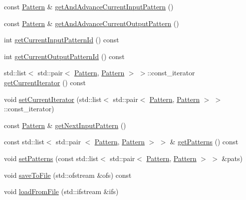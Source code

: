 \begin{DoxyCompactItemize}
const \hyperlink{classcryomesh_1_1state_1_1Pattern}{\-Pattern} \& \hyperlink{classcryomesh_1_1state_1_1Sequence_ab9ace25c4ec3b2490dfbffff27fc51e8}{get\-And\-Advance\-Current\-Input\-Pattern} ()
\item 
const \hyperlink{classcryomesh_1_1state_1_1Pattern}{\-Pattern} \& \hyperlink{classcryomesh_1_1state_1_1Sequence_a516640e73b0f09ee08758d9ce89e51f4}{get\-And\-Advance\-Current\-Output\-Pattern} ()
\item 
int \hyperlink{classcryomesh_1_1state_1_1Sequence_a7f12365034bd9d6453a29384e232f9a5}{get\-Current\-Input\-Pattern\-Id} () const 
\item 
int \hyperlink{classcryomesh_1_1state_1_1Sequence_a97659380bb1c69d31a012c3b9c9053e8}{get\-Current\-Output\-Pattern\-Id} () const 
\item 
std\-::list$<$ std\-::pair$<$ \hyperlink{classcryomesh_1_1state_1_1Pattern}{\-Pattern}, \*
\hyperlink{classcryomesh_1_1state_1_1Pattern}{\-Pattern} $>$ $>$\-::const\-\_\-iterator \hyperlink{classcryomesh_1_1state_1_1Sequence_a65b44032582f5585d5d2f77f3e5a58e4}{get\-Current\-Iterator} () const 
\item 
void \hyperlink{classcryomesh_1_1state_1_1Sequence_afa89b46faf1c362b228e8f1efe573305}{set\-Current\-Iterator} (std\-::list$<$ std\-::pair$<$ \hyperlink{classcryomesh_1_1state_1_1Pattern}{\-Pattern}, \hyperlink{classcryomesh_1_1state_1_1Pattern}{\-Pattern} $>$ $>$\-::const\-\_\-iterator)
\item 
const \hyperlink{classcryomesh_1_1state_1_1Pattern}{\-Pattern} \& \hyperlink{classcryomesh_1_1state_1_1Sequence_ab6e3d9d6bff30c8a551c1ffdc2318985}{get\-Next\-Input\-Pattern} ()
\item 
const std\-::list$<$ std\-::pair\*
$<$ \hyperlink{classcryomesh_1_1state_1_1Pattern}{\-Pattern}, \hyperlink{classcryomesh_1_1state_1_1Pattern}{\-Pattern} $>$ $>$ \& \hyperlink{classcryomesh_1_1state_1_1Sequence_a4112e63451057c277a8409e00087910a}{get\-Patterns} () const 
\item 
void \hyperlink{classcryomesh_1_1state_1_1Sequence_acf04489c97e153eafab5da22aef651e1}{set\-Patterns} (const std\-::list$<$ std\-::pair$<$ \hyperlink{classcryomesh_1_1state_1_1Pattern}{\-Pattern}, \hyperlink{classcryomesh_1_1state_1_1Pattern}{\-Pattern} $>$ $>$ \&pats)
\item 
void \hyperlink{classcryomesh_1_1state_1_1Sequence_a93c04940985c61a2c1aea2a56af7ecf8}{save\-To\-File} (std\-::ofstream \&ofs) const 
\item 
void \hyperlink{classcryomesh_1_1state_1_1Sequence_af184d280f5862bdc10c5bff86d3edf19}{load\-From\-File} (std\-::ifstream \&ifs)

\end{DoxyCompactItemize}
